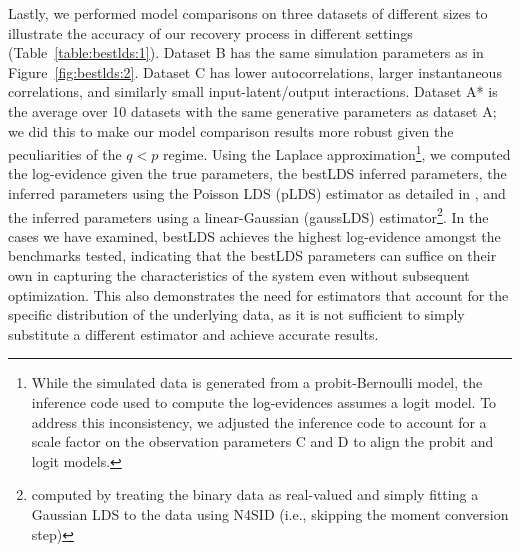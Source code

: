 Lastly, we performed model comparisons on three datasets of different sizes to illustrate the accuracy of our recovery process in different settings (Table~\ref{table:bestlds:1}). Dataset B has the same simulation parameters as in Figure~\ref{fig:bestlds:2}. Dataset C has lower autocorrelations, larger instantaneous correlations, and similarly small input-latent/output interactions. Dataset A* is the average over 10 datasets with the same generative parameters as dataset A;  we did this to make our model comparison results more robust given the peculiarities of the $q<p$ regime. Using the Laplace approximation\footnote{While the simulated data is generated from a probit-Bernoulli model, the inference code used to compute the log-evidences assumes a logit model. To address this inconsistency, we adjusted the inference code to account for a scale factor on the observation parameters C and D to align the probit and logit models.}, we computed the log-evidence given the true parameters, the bestLDS inferred parameters, the inferred parameters using the Poisson LDS (pLDS) estimator as detailed in \cite{buesing_spectral_2012}, and the inferred parameters using a linear-Gaussian (gaussLDS) estimator\footnote{computed by treating the binary data as real-valued and simply fitting a Gaussian LDS to the data using N4SID (i.e., skipping the moment conversion step)}. In the cases we have examined, bestLDS achieves the highest log-evidence amongst the benchmarks tested, indicating that the bestLDS parameters can suffice on their own in capturing the characteristics of the system even without subsequent optimization. This also demonstrates the need for estimators that account for the specific distribution of the underlying data, as it is not sufficient to simply substitute a different estimator and achieve accurate results. 